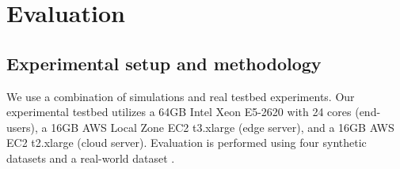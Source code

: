 \section{Evaluation}
\label{sec:eval}
\subsection{Experimental setup and methodology}
    We use a combination of simulations and real testbed experiments.
    Our experimental testbed utilizes a 64GB Intel Xeon E5-2620 with 24 cores (end-users), a 16GB AWS Local Zone EC2 t3.xlarge (edge server), and a 16GB AWS EC2 t2.xlarge (cloud server).  Evaluation is performed using four synthetic datasets and a real-world dataset \cite{bib:spmf}. 
    

